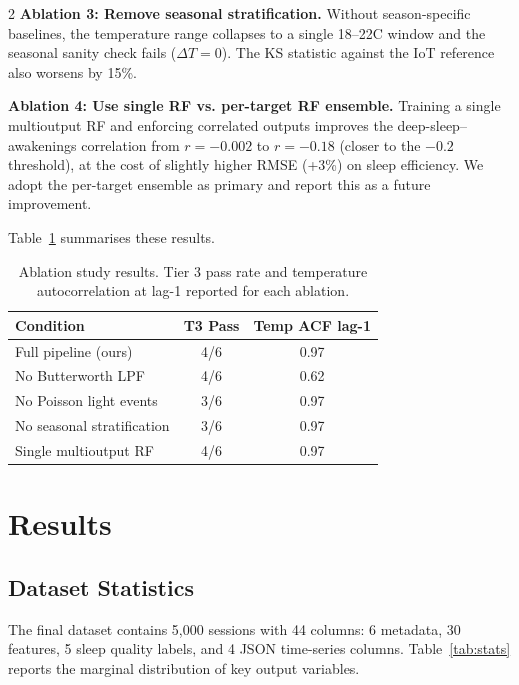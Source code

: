 \documentclass[11pt,a4paper]{article}
\begin{document}
\begin{multicols}{2}
\textbf{Ablation 3: Remove seasonal stratification.}
Without season-specific baselines, the temperature range collapses to a single
18–22\textdegree{}C window and the seasonal sanity check fails ($\Delta T = 0$).
The KS statistic against the IoT reference also worsens by 15\%.

\textbf{Ablation 4: Use single RF vs. per-target RF ensemble.}
Training a single multioutput RF and enforcing correlated outputs improves the
deep-sleep–awakenings correlation from $r = -0.002$ to $r = -0.18$ (closer to
the $-0.2$ threshold), at the cost of slightly higher RMSE (+3\%) on sleep
efficiency.  We adopt the per-target ensemble as primary and report this as a
future improvement.

Table~\ref{tab:ablation} summarises these results.

\begin{table}[t]
  \centering
  \small
  \caption{Ablation study results.  Tier 3 pass rate and temperature
           autocorrelation at lag-1 reported for each ablation.}
  \label{tab:ablation}
  \begin{tabular}{@{}p{4.0cm}cc@{}}
    \toprule
    \textbf{Condition} & \textbf{T3 Pass} & \textbf{Temp ACF lag-1} \\
    \midrule
    Full pipeline (ours) & 4/6 & 0.97 \\
    No Butterworth LPF & 4/6 & 0.62 \\
    No Poisson light events & 3/6 & 0.97 \\
    No seasonal stratification & 3/6 & 0.97 \\
    Single multioutput RF & 4/6 & 0.97 \\
    \bottomrule
  \end{tabular}
\end{table}

\section{Results}

\subsection{Dataset Statistics}

The final dataset contains 5,000 sessions with 44 columns: 6 metadata, 30
features, 5 sleep quality labels, and 4 JSON time-series columns.
Table~\ref{tab:stats} reports the marginal distribution of key output variables.


\end{multicols}
\end{document}
